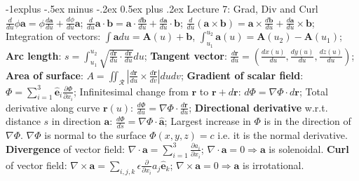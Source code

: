 \documentclass[10pt,landscape]{article}
\makeatletter
\renewcommand{\subsection}{\@startsection{subsection}{2}{0mm}%
                                {-1explus -.5ex minus -.2ex}%
                                {0.5ex plus .2ex}%
                                {\normalfont\normalsize\bfseries}}
\makeatother
\begin{document}
\begin{multicols}{3}
\subsection{Lecture 7: Grad, Div and Curl}
$\frac{d}{du} \phi \mathbf{a} = \phi \frac{d\mathbf{a}}{du} + \frac{d\phi}{du} 
	\mathbf{a}$;
$\frac{d}{du} \mathbf{a} \cdot \mathbf{b} = \mathbf{a} \cdot
	\frac{d\mathbf{b}}{du} + \frac{d\mathbf{a}}{du} \cdot \mathbf{b}$;
$\frac{d}{du} (\mathbf{a} \times \mathbf{b}) = \mathbf{a} \times
	\frac{d\mathbf{b}}{du} + \frac{d\mathbf{a}}{du} \times \mathbf{b}$;
Integration of vectors: $\int \mathbf{a} du = \mathbf{A}(u) + \mathbf{b}$, 
	$\int_{u_1}^{u_2} \mathbf{a}(u) = \mathbf{A}(u_2) - \mathbf{A}(u_1)$;
\textbf{Arc length}: $s = \int_{u_1}^{u_2} \sqrt{\frac{d\mathbf{r}}{du} \cdot
	\frac{d\mathbf{r}}{du}} du$;
\textbf{Tangent vector}: $\frac{d\mathbf{r}}{du} = \left( \frac{dx(u)}{du},
	\frac{dy(u)}{du}, \frac{dz(u)}{du} \right)$;
\textbf{Area of surface}: $A = \iint_\mathcal{R} \left| \frac{d\mathbf{r}}{du} \times 
	\frac{d\mathbf{r}}{dv} \right| dudv$;
\textbf{Gradient of scalar field}: $\Phi = \sum_{i=1}^3 \hat{\mathbf{e}}_i 
	\frac{\partial \Phi}{\partial x_i}$;
Infinitesimal change from $\mathbf{r}$ to $\mathbf{r} + d\mathbf{r}$: 
	$d\Phi = \nabla \Phi \cdot d\mathbf{r}$;
Total derivative along curve $\mathbf{r}(u)$: 
	$\frac{d\Phi}{du} = \nabla \Phi \cdot \frac{d\mathbf{r}}{du}$;
\textbf{Directional derivative} w.r.t. distance $s$ in direction $\mathbf{a}$: 
	$\frac{d\Phi}{ds} = \nabla \Phi \cdot \hat{\mathbf{a}}$;
Largest increase in $\Phi$ is in the direction of $\nabla \Phi$.
$\nabla\Phi$ is normal to the surface $\Phi(x,y,z)=c$ i.e. it is the normal
	derivative.
\textbf{Divergence} of vector field: $\nabla \cdot \mathbf{a} = \sum_{i=1}^3 
	\frac{\partial a_i}{\partial x_i}$;
$\nabla \cdot \mathbf{a} = 0 \Rightarrow \mathbf{a}$ is solenoidal.
\textbf{Curl} of vector field: $\nabla \times \mathbf{a} = \sum_{i,j,k}
	\epsilon \frac{\partial}{\partial x_i} a_j \hat{\mathbf{e}}_k$;
$\nabla \times \mathbf{a} = 0 \Rightarrow \mathbf{a}$ is irrotational.


\end{multicols}
\end{document}
